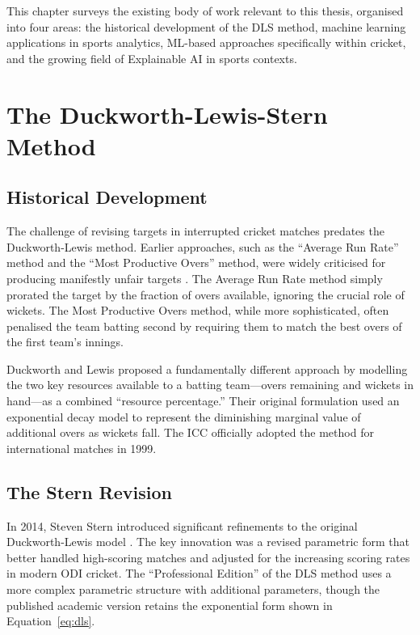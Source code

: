 \documentclass[12pt,a4paper,oneside]{report}
\begin{document}
This chapter surveys the existing body of work relevant to this thesis, organised into four areas: the historical development of the DLS method, machine learning applications in sports analytics, ML-based approaches specifically within cricket, and the growing field of Explainable AI in sports contexts.

\section{The Duckworth-Lewis-Stern Method}

\subsection{Historical Development}

The challenge of revising targets in interrupted cricket matches predates the Duckworth-Lewis method. Earlier approaches, such as the ``Average Run Rate'' method and the ``Most Productive Overs'' method, were widely criticised for producing manifestly unfair targets \citep{duckworth1998}. The Average Run Rate method simply prorated the target by the fraction of overs available, ignoring the crucial role of wickets. The Most Productive Overs method, while more sophisticated, often penalised the team batting second by requiring them to match the best overs of the first team's innings.

Duckworth and Lewis \citep{duckworth1998} proposed a fundamentally different approach by modelling the two key resources available to a batting team---overs remaining and wickets in hand---as a combined ``resource percentage.'' Their original formulation used an exponential decay model to represent the diminishing marginal value of additional overs as wickets fall. The ICC officially adopted the method for international matches in 1999.

\subsection{The Stern Revision}

In 2014, Steven Stern introduced significant refinements to the original Duckworth-Lewis model \citep{stern2016}. The key innovation was a revised parametric form that better handled high-scoring matches and adjusted for the increasing scoring rates in modern ODI cricket. The ``Professional Edition'' of the DLS method uses a more complex parametric structure with additional parameters, though the published academic version retains the exponential form shown in Equation~\ref{eq:dls}.
\end{document}
